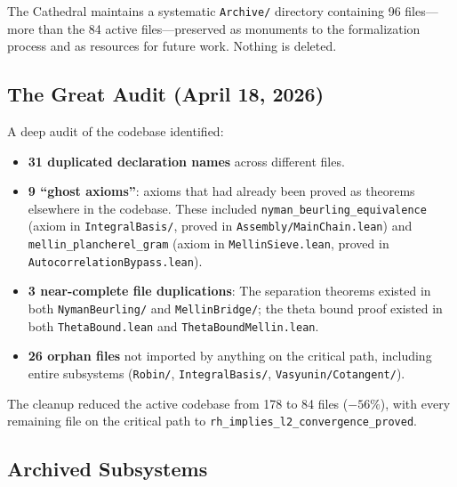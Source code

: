 \documentclass[11pt,a4paper]{article}
\theoremstyle{definition}
\newcommand{\lean}[1]{\texttt{#1}}
\begin{document}
The Cathedral maintains a systematic \lean{Archive/} directory containing
96 files---more than the 84 active files---preserved as monuments to the
formalization process and as resources for future work. Nothing is deleted.

\subsection{The Great Audit (April 18, 2026)}

A deep audit of the codebase identified:
\begin{itemize}
  \item \textbf{31 duplicated declaration names} across different files.
  \item \textbf{9 ``ghost axioms''}: axioms that had already been proved
    as theorems elsewhere in the codebase. These included
    \lean{nyman\_beurling\_equivalence} (axiom in \lean{IntegralBasis/},
    proved in \lean{Assembly/MainChain.lean}) and
    \lean{mellin\_plancherel\_gram} (axiom in \lean{MellinSieve.lean},
    proved in \lean{AutocorrelationBypass.lean}).
  \item \textbf{3 near-complete file duplications}: The separation
    theorems existed in both \lean{NymanBeurling/} and \lean{MellinBridge/};
    the theta bound proof existed in both \lean{ThetaBound.lean} and
    \lean{ThetaBoundMellin.lean}.
  \item \textbf{26 orphan files} not imported by anything on the critical
    path, including entire subsystems (\lean{Robin/}, \lean{IntegralBasis/},
    \lean{Vasyunin/Cotangent/}).
\end{itemize}

The cleanup reduced the active codebase from 178 to 84 files ($-56\%$),
with every remaining file on the critical path to
\lean{rh\_implies\_l2\_convergence\_proved}.

\subsection{Archived Subsystems}
\end{document}
